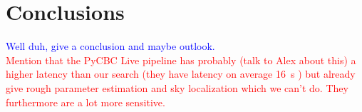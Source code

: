 \section{Conclusions}
\textcolor{blue}{Well duh, give a conclusion and maybe outlook.}\\
\textcolor{red}{Mention that the PyCBC Live pipeline has probably (talk to Alex about this) a higher latency than our search (they have latency on average \SI{16}{\s} \cite{pycbc_live}) but already give rough parameter estimation and sky localization which we can't do. They furthermore are a lot more sensitive.}